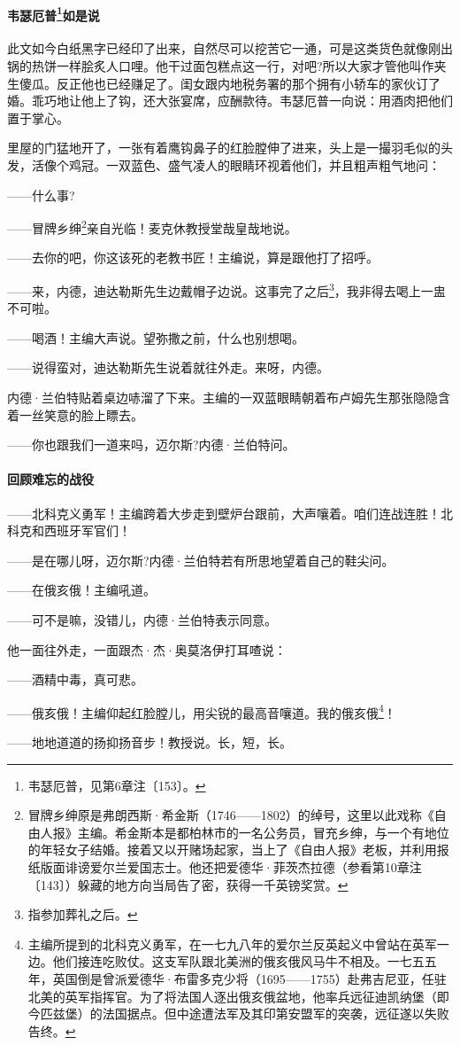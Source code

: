 \paragraph*{韦瑟厄普\footnote{韦瑟厄普，见第6章注〔153〕。}如是说}
\par 此文如今白纸黑字已经印了出来，自然尽可以挖苦它一通，可是这类货色就像刚出锅的热饼一样脍炙人口哩。他干过面包糕点这一行，对吧?所以大家才管他叫作夹生傻瓜。反正他也已经赚足了。闺女跟内地税务署的那个拥有小轿车的家伙订了婚。乖巧地让他上了钩，还大张宴席，应酬款待。韦瑟厄普一向说：用酒肉把他们置于掌心。
\par 里屋的门猛地开了，一张有着鹰钩鼻子的红脸膛伸了进来，头上是一撮羽毛似的头发，活像个鸡冠。一双蓝色、盛气凌人的眼睛环视着他们，并且粗声粗气地问：
\par ——什么事?
\par ——冒牌乡绅\footnote{冒牌乡绅原是弗朗西斯·希金斯（1746——1802）的绰号，这里以此戏称《自由人报》主编。希金斯本是都柏林市的一名公务员，冒充乡绅，与一个有地位的年轻女子结婚。接着又以开赌场起家，当上了《自由人报》老板，并利用报纸版面诽谤爱尔兰爱国志士。他还把爱德华·菲茨杰拉德（参看第10章注〔143〕）躲藏的地方向当局告了密，获得一千英镑奖赏。}亲自光临！麦克休教授堂哉皇哉地说。
\par ——去你的吧，你这该死的老教书匠！主编说，算是跟他打了招呼。
\par ——来，内德，迪达勒斯先生边戴帽子边说。这事完了之后\footnote{指参加葬礼之后。}，我非得去喝上一盅不可啦。
\par ——喝酒！主编大声说。望弥撒之前，什么也别想喝。
\par ——说得蛮对，迪达勒斯先生说着就往外走。来呀，内德。
\par 内德·兰伯特贴着桌边哧溜了下来。主编的一双蓝眼睛朝着布卢姆先生那张隐隐含着一丝笑意的脸上瞟去。
\par ——你也跟我们一道来吗，迈尔斯?内德·兰伯特问。
\paragraph*{回顾难忘的战役}
\par ——北科克义勇军！主编跨着大步走到壁炉台跟前，大声嚷着。咱们连战连胜！北科克和西班牙军官们！
\par ——是在哪儿呀，迈尔斯?内德·兰伯特若有所思地望着自己的鞋尖问。
\par ——在俄亥俄！主编吼道。
\par ——可不是嘛，没错儿，内德·兰伯特表示同意。
\par 他一面往外走，一面跟杰·杰·奥莫洛伊打耳喳说：
\par ——酒精中毒，真可悲。
\par ——俄亥俄！主编仰起红脸膛儿，用尖锐的最高音嚷道。我的俄亥俄\footnote{主编所提到的北科克义勇军，在一七九八年的爱尔兰反英起义中曾站在英军一边。他们接连吃败仗。这支军队跟北美洲的俄亥俄风马牛不相及。一七五五年，英国倒是曾派爱德华·布雷多克少将（1695——1755）赴弗吉尼亚，任驻北美的英军指挥官。为了将法国人逐出俄亥俄盆地，他率兵远征迪凯纳堡（即今匹兹堡）的法国据点。但中途遭法军及其印第安盟军的突袭，远征遂以失败告终。}！
\par ——地地道道的扬抑扬音步！教授说。长，短，长。
